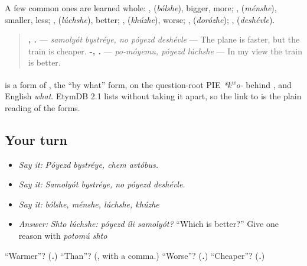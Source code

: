 \begin{grammarlens}[title={Grammar Lens: the ones that change shape}]
A few common ones are learned whole: \emph{}, \textbf{} (\emph{bólshe}), bigger, more; \emph{}, \textbf{} (\emph{ménshe}), smaller, less; \emph{}, \textbf{} (\emph{lúchshe}), better; \emph{}, \textbf{} (\emph{khúzhe}), worse; \emph{}, \textbf{} (\emph{dorózhe}); \emph{}, \textbf{} (\emph{deshévle}).

\begin{quote}
\textbf{ ,   .} — \emph{samolyót bystréye, no póyezd deshévle} — The plane is faster, but the train is cheaper. \textbf{-,  .} — \emph{po-móyemu, póyezd lúchshe} — In my view the train is better.
\end{quote}
\end{grammarlens}

\begin{cousinweb}
\textbf{} is a form of \textbf{}, the \textquotedblleft{}by what\textquotedblright{} form, on the question-root PIE \emph{*k\textsuperscript{w}o-} behind \emph{}, \emph{} and English \emph{what}. EtymDB 2.1 lists \emph{} without taking it apart, so the link to \emph{} is the plain reading of the forms.
\end{cousinweb}

\subsection*{Your turn}
\begin{itemize}
\raggedright
  \item \emph{Say it:} \emph{Póyezd bystréye, chem avtóbus.}
  \item \emph{Say it:} \emph{Samolyót bystréye, no póyezd deshévle.}
  \item \emph{Say it:} \emph{bólshe, ménshe, lúchshe, khúzhe}
  \item \emph{Answer:} \emph{Shto lúchshe: póyezd íli samolyót?} \textquotedblleft{}Which is better?\textquotedblright{} Give one reason with \emph{potomú shto}
\end{itemize}

\begin{tcolorbox}[breakable,colback=teal!4,colframe=teal!35!black,title={Before you move on}]
\textquotedblleft{}Warmer\textquotedblright{}? (\emph{\textbf{.}}) \textquotedblleft{}Than\textquotedblright{}? (\emph{\textbf{}}, with a comma.) \textquotedblleft{}Worse\textquotedblright{}? (\emph{\textbf{.}}) \textquotedblleft{}Cheaper\textquotedblright{}? (\emph{\textbf{.}})
\end{tcolorbox}
